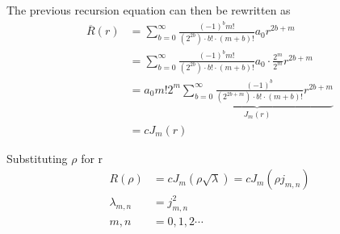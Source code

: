 \documentclass[11pt]{article}
\begin{document}
The previous recursion equation can then be rewritten as
\begin{equation}
\begin{split} 
\overline{R}(r) &= \sum_{b=0}^{\infty} \frac{(-1)^b m!}{(2^{2b}) \cdot b! \cdot (m + b)!} a_{0} r^{2b + m}  \\
&= \sum_{b=0}^{\infty} \frac{(-1)^b m!}{(2^{2b}) \cdot b! \cdot (m + b)!} a_{0} \cdot \frac{2^m}{2^m} r^{2b + m}  \\
&= a_{0}  m! 2^m \underbrace{\sum_{b=0}^{\infty} \frac{(-1)^b}{(2^{2b + m}) \cdot b! \cdot (m + b)!} r^{2b + m}}_{J_m(r)}   \\
&= c J_{m}(r)
\end{split} 
\end{equation}

Substituting \(\rho\) for r \begin{equation}
\begin{split} 
{R}(\rho) &= c J_{m}(\rho \sqrt \lambda) = c J_{m}(\rho j_{m,n}) \\
\lambda_{m,n} &= j_{m,n}^2 \\
m, n &= 0, 1, 2 \cdots
\end{split} 
\end{equation}
\end{document}
